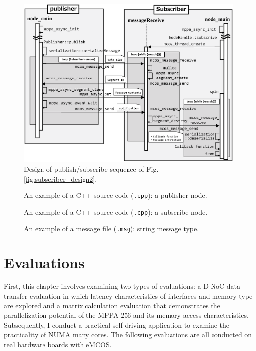 \begin{figure}[thbp]
  \centering
  \includegraphics[width=0.9\linewidth]{../figure/roslite/design/pubsub_thread_design2.eps}
  \caption{\label{fig:pubsub_thread_design2}
    Design of publish/subscribe sequence of Fig. \ref{fig:subscriber_design2}.}
  \vspace{-10mm}
\end{figure}

\begin{figure}[thbp]
  \centering
  
  \caption{\label{code:talker}
    An example of a C++ source code (\texttt{.cpp}): a publisher node.}
\end{figure}

\begin{figure}[thbp]
  \centering
  
  \caption{\label{code:listener}
    An example of a C++ source code (\texttt{.cpp}): a subscribe node.}
\end{figure}

\begin{figure}[thbp]
  \centering
  
  \caption{\label{code:msg}
    An example of a message file (\texttt{.msg}): string message type.}
\end{figure}

\chapter{Evaluations}
\label{chap:evaluations}
First, this chapter involves examining two types of evaluations: a D-NoC data transfer evaluation in which latency characteristics of interfaces and memory type are explored and a matrix calculation evaluation that demonstrates the parallelization potential of the MPPA-256 and its memory access characteristics.
Subsequently, I conduct a practical self-driving application to examine the practicality of NUMA many cores.
The following evaluations are all conducted on real hardware boards with eMCOS.

